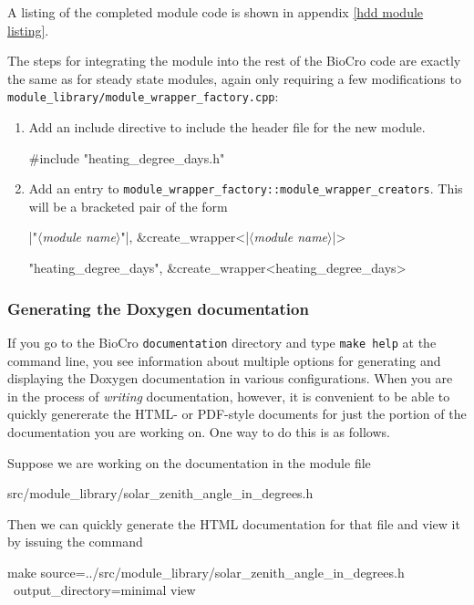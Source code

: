 \documentclass{article}\usepackage[]{graphicx}\usepackage[]{color}
\newcommand{\code}[1]{\lstinline[style=C++style]{#1}}
\newcommand{\placeholder}[1]{$\langle$\textrm{\textit{#1}}$\rangle$}
\newcommand{\stringplaceholder}[1]{{\color{stringcolor}"$\langle$\textrm{\textit{#1}}$\rangle$"}}
\begin{document}
A listing of the completed module code is shown in appendix \ref{hdd
  module listing}.

The steps for integrating the module into the rest of the BioCro code
are exactly the same as for steady state modules, again only requiring
a few modifications to
\code{module_library/module_wrapper_factory.cpp}:

\begin{enumerate}

\item Add an include directive to include the header file for the new module.
  \begin{example}[4]
    #include "heating_degree_days.h"
  \end{example}

\item Add an entry to
  \code{module_wrapper_factory::module_wrapper_creators}.  This
  will be a bracketed pair of the form
  \begin{C++listing}[4]
    {|\stringplaceholder{module name}|, &create_wrapper<|\placeholder{module name}|>}
  \end{C++listing}
  \begin{example}[4]
    {"heating_degree_days", &create_wrapper<heating_degree_days>}
  \end{example}

\end{enumerate}

\subsubsection{Generating the Doxygen documentation}
\label{sec:doxygen}

If you go to the BioCro \code{documentation} directory and type
\code{make help} at the command line, you see information about
multiple options for generating and displaying the Doxygen
documentation in various configurations.  When you are in the process
of \emph{writing} documentation, however, it is convenient to be able
to quickly genererate the HTML- or PDF-style documents for just the
portion of the documentation you are working on.  One way to do this
is as follows.

Suppose we are working on the documentation in the module file
\begin{sh_listing}[2]
  src/module_library/solar_zenith_angle_in_degrees.h
\end{sh_listing}
Then we can quickly generate the HTML documentation for that file and
view it by issuing the command
\begin{sh_listing}[2]
  make source=../src/module_library/solar_zenith_angle_in_degrees.h \
       output_directory=minimal view
\end{sh_listing}
\end{document}
